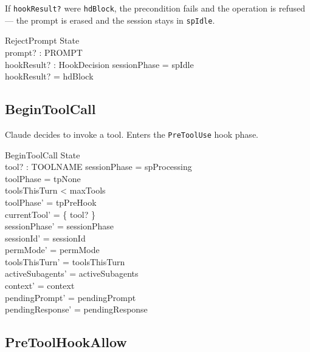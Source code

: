 \documentclass[a4paper,10pt,fleqn]{article}
\begin{document}
If \texttt{hookResult?} were \texttt{hdBlock}, the precondition fails
and the operation is refused --- the prompt is erased and the session
stays in \texttt{spIdle}.

\begin{schema}{RejectPrompt}
  \Xi State \\
  prompt? : PROMPT \\
  hookResult? : HookDecision
  \where
  sessionPhase = spIdle \\
  hookResult? = hdBlock
\end{schema}

\subsection{BeginToolCall}

Claude decides to invoke a tool. Enters the \texttt{PreToolUse} hook
phase.

\begin{schema}{BeginToolCall}
  \Delta State \\
  tool? : TOOLNAME
  \where
  sessionPhase = spProcessing \\
  toolPhase = tpNone \\
  toolsThisTurn < maxTools \\
  toolPhase' = tpPreHook \\
  currentTool' = \{ tool? \} \\
  sessionPhase' = sessionPhase \\
  sessionId' = sessionId \\
  permMode' = permMode \\
  toolsThisTurn' = toolsThisTurn \\
  activeSubagents' = activeSubagents \\
  context' = context \\
  pendingPrompt' = pendingPrompt \\
  pendingResponse' = pendingResponse
\end{schema}

\subsection{PreToolHookAllow}
\end{document}
